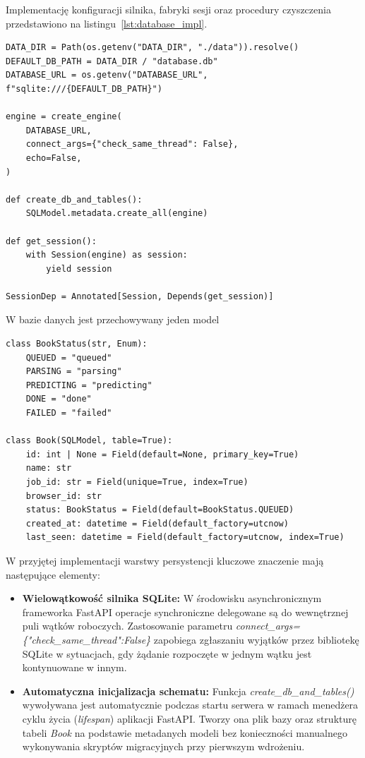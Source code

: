 Implementację konfiguracji silnika, fabryki sesji oraz procedury czyszczenia przedstawiono na listingu~\ref{lst:database_impl}.

\begin{lstlisting}[style=pythonStyle, label={lst:database_impl}, caption={Konfiguracja silnika bazy danych i wstrzykiwania sesji w pliku database.py}]
DATA_DIR = Path(os.getenv("DATA_DIR", "./data")).resolve()
DEFAULT_DB_PATH = DATA_DIR / "database.db"
DATABASE_URL = os.getenv("DATABASE_URL", f"sqlite:///{DEFAULT_DB_PATH}")

engine = create_engine(
    DATABASE_URL,
    connect_args={"check_same_thread": False},
    echo=False,
)

def create_db_and_tables():
    SQLModel.metadata.create_all(engine)

def get_session():
    with Session(engine) as session:
        yield session

SessionDep = Annotated[Session, Depends(get_session)]
\end{lstlisting}

W bazie danych jest przechowywany jeden model
\begin{lstlisting}[style=pythonStyle, label={lst:book_model}, caption={
    Reprezentacja modelu książki w bazie danych.
}]
class BookStatus(str, Enum):
    QUEUED = "queued"
    PARSING = "parsing"
    PREDICTING = "predicting"
    DONE = "done"
    FAILED = "failed"

class Book(SQLModel, table=True):
    id: int | None = Field(default=None, primary_key=True)
    name: str
    job_id: str = Field(unique=True, index=True)
    browser_id: str
    status: BookStatus = Field(default=BookStatus.QUEUED)
    created_at: datetime = Field(default_factory=utcnow)
    last_seen: datetime = Field(default_factory=utcnow, index=True)
\end{lstlisting}

W przyjętej implementacji warstwy persystencji kluczowe znaczenie mają następujące elementy:
\begin{itemize}
    \item \textbf{Wielowątkowość silnika SQLite:} W środowisku asynchronicznym frameworka FastAPI operacje synchroniczne delegowane są do wewnętrznej puli wątków roboczych.
    Zastosowanie parametru \textit{connect\_args=\allowbreak\{"check\_same\_thread":\allowbreak False\}} zapobiega zgłaszaniu wyjątków przez bibliotekę SQLite w sytuacjach, gdy
    żądanie rozpoczęte w jednym wątku jest kontynuowane w innym.
    \item \textbf{Automatyczna inicjalizacja schematu:} Funkcja \textit{create\_db\_and\_tables()} wywoływana jest automatycznie podczas startu serwera w ramach menedżera cyklu życia
    (\textit{lifespan}) aplikacji FastAPI. Tworzy ona plik bazy oraz strukturę tabeli \textit{Book} na podstawie metadanych modeli bez konieczności manualnego wykonywania skryptów
    migracyjnych przy pierwszym wdrożeniu.
\end{itemize}

